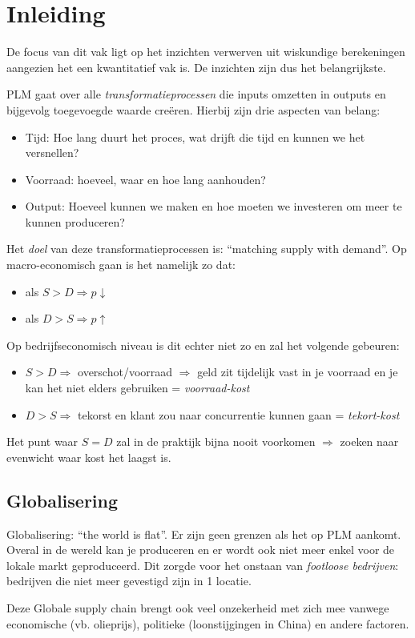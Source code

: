 \section{Inleiding}
De focus van dit vak ligt op het inzichten verwerven uit wiskundige berekeningen aangezien het een kwantitatief vak is. De inzichten zijn dus het belangrijkste.

PLM gaat over alle \textit{transformatieprocessen} die inputs omzetten in outputs en bijgevolg toegevoegde waarde cre\"eren. Hierbij zijn drie aspecten van belang:
\begin{itemize}
    \item Tijd: Hoe lang duurt het proces, wat drijft die tijd en kunnen we het versnellen?
    \item Voorraad: hoeveel, waar en hoe lang aanhouden?
    \item Output: Hoeveel kunnen we maken en hoe moeten we investeren om meer te kunnen produceren?
\end{itemize}

Het \textit{doel} van deze transformatieprocessen is: ``matching supply with demand''. Op macro-economisch gaan is het namelijk zo dat:
\begin{itemize}
    \item als $S > D \Rightarrow p \downarrow$
    \item als $D > S \Rightarrow p \uparrow$
\end{itemize}
Op bedrijfseconomisch niveau is dit echter niet zo en zal het volgende gebeuren:
\begin{itemize}
    \item $S > D \Rightarrow$ overschot/voorraad $\Rightarrow$ geld zit tijdelijk vast in je voorraad en je kan het niet elders gebruiken = \textit{voorraad-kost}
    \item $D > S \Rightarrow$ tekorst en klant zou naar concurrentie kunnen gaan = \textit{tekort-kost}
\end{itemize}

Het punt waar $S = D$ zal in de praktijk bijna nooit voorkomen $\Rightarrow$ zoeken naar evenwicht waar kost het laagst is.

\subsection{Globalisering}
Globalisering: ``the world is flat''. Er zijn geen grenzen als het op PLM aankomt. Overal in de wereld kan je produceren en er wordt ook niet meer enkel voor de lokale markt geproduceerd. Dit zorgde voor het onstaan van \textit{footloose bedrijven}: bedrijven die niet meer gevestigd zijn in 1 locatie.

Deze Globale supply chain brengt ook veel onzekerheid met zich mee vanwege economische (vb. olieprijs), politieke (loonstijgingen in China) en andere factoren.
